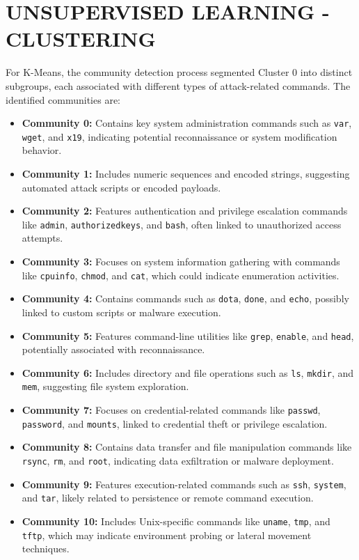 
\section{UNSUPERVISED LEARNING - CLUSTERING}

    

    For K-Means, the community detection process segmented Cluster 0 into distinct subgroups, each associated with different types of attack-related commands. The identified communities are:

        \begin{itemize}
        \item \textbf{Community 0:} Contains key system administration commands such as \texttt{var}, \texttt{wget}, and \texttt{x19}, indicating potential reconnaissance or system modification behavior.
        \item \textbf{Community 1:} Includes numeric sequences and encoded strings, suggesting automated attack scripts or encoded payloads.
        \item \textbf{Community 2:} Features authentication and privilege escalation commands like \texttt{admin}, \texttt{authorizedkeys}, and \texttt{bash}, often linked to unauthorized access attempts.
        \item \textbf{Community 3:} Focuses on system information gathering with commands like \texttt{cpuinfo}, \texttt{chmod}, and \texttt{cat}, which could indicate enumeration activities.
        \item \textbf{Community 4:} Contains commands such as \texttt{dota}, \texttt{done}, and \texttt{echo}, possibly linked to custom scripts or malware execution.
        \item \textbf{Community 5:} Features command-line utilities like \texttt{grep}, \texttt{enable}, and \texttt{head}, potentially associated with reconnaissance.
        \item \textbf{Community 6:} Includes directory and file operations such as \texttt{ls}, \texttt{mkdir}, and \texttt{mem}, suggesting file system exploration.
        \item \textbf{Community 7:} Focuses on credential-related commands like \texttt{passwd}, \texttt{password}, and \texttt{mounts}, linked to credential theft or privilege escalation.
        \item \textbf{Community 8:} Contains data transfer and file manipulation commands like \texttt{rsync}, \texttt{rm}, and \texttt{root}, indicating data exfiltration or malware deployment.
        \item \textbf{Community 9:} Features execution-related commands such as \texttt{ssh}, \texttt{system}, and \texttt{tar}, likely related to persistence or remote command execution.
        \item \textbf{Community 10:} Includes Unix-specific commands like \texttt{uname}, \texttt{tmp}, and \texttt{tftp}, which may indicate environment probing or lateral movement techniques.
        \end{itemize}

